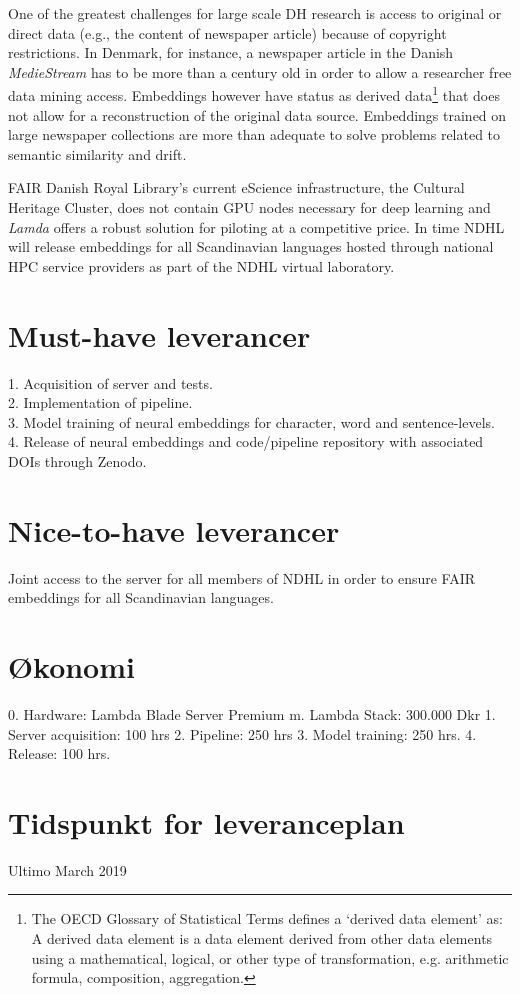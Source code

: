 \documentclass[12pt,a4paper]{article}
\begin{document}
One of the greatest challenges for large scale DH research is access to original or direct data (e.g., the content of newspaper article) because of copyright restrictions. In Denmark, for instance, a newspaper article in the Danish \textit{MedieStream} has to be more than a century old in order to allow a researcher free data mining access. Embeddings however have status as derived data\footnote{The OECD Glossary of Statistical Terms defines a `derived data element' as: A derived data element is a data element derived from other data elements using a mathematical, logical, or other type of transformation, e.g. arithmetic formula, composition, aggregation.} that does not allow for a reconstruction of the original data source. Embeddings trained on large newspaper collections are more than adequate to solve problems related to semantic similarity and drift.

FAIR Danish Royal Library's current eScience infrastructure, the Cultural Heritage Cluster, does not contain GPU nodes necessary for deep learning and \textit{Lamda} offers a robust solution for piloting at a competitive price. In time NDHL will release embeddings for all Scandinavian languages hosted through national HPC service providers as part of the NDHL virtual laboratory.

\section*{Must-have leverancer}
1. Acquisition of server and tests.\\
2. Implementation of pipeline.\\
3. Model training of neural embeddings for character, word and sentence-levels.\\
4. Release of neural embeddings and code/pipeline repository with associated DOIs through Zenodo.\\  
\section*{Nice-to-have leverancer}
Joint access to the server for all members of NDHL in order to ensure FAIR embeddings for all Scandinavian languages.

\section*{Økonomi}
0. Hardware: Lambda Blade Server Premium m. Lambda Stack: 300.000 Dkr
1. Server acquisition: 100 hrs
2. Pipeline: 250 hrs
3. Model training: 250 hrs.
4. Release: 100 hrs.

\section*{Tidspunkt for leveranceplan}
Ultimo March 2019
\end{document}
